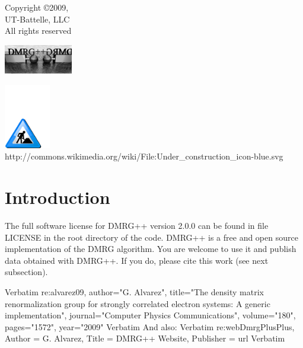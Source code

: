 \documentclass[paper=letter]{scrartcl}
\begin{document}
\begin{titlepage}
\begin{tiny}
\fontshape{\shapedefault}\selectfont
\end{tiny}
\noindent
\begin{minipage}{0.4\textwidth}
Copyright \copyright 2009,\\
 UT-Battelle, LLC\\
All rights reserved
\end{minipage}
\hfill
\begin{minipage}{0.4\textwidth}
\begin{flushright}
\includegraphics[width=3cm]{dmrgV2LogoBW.png}
\end{flushright}
\end{minipage}
\end{titlepage}
\tableofcontents

\begin{center}
\includegraphics[width=2cm]{Under_construction_icon-blue}\\
{\tiny http://commons.wikimedia.org/wiki/File:Under\_construction\_icon-blue.svg}
\end{center}
\pagebreak

\section{Introduction}
The full software license for DMRG++ version 2.0.0 can be found in file LICENSE in the root directory of the code. DMRG++ is a free and open source implementation of the DMRG algorithm. You are welcome to use it and publish data obtained with DMRG++. If you do, please cite this work (see next subsection).

{Verbatim} {re:alvarez09, author="G. Alvarez", title="The density matrix renormalization group for strongly correlated electron
systems: A generic implementation", journal="Computer Physics Communications", volume="180", pages="1572", year="2009"} {Verbatim} And also: {Verbatim} { re:webDmrgPlusPlus, Author = {G. Alvarez}, Title = {DMRG++ Website}, Publisher = {{url}} } {Verbatim}
\end{document}
